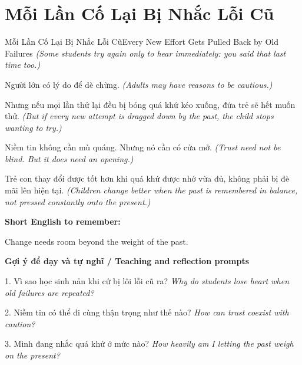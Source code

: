 \section{Mỗi Lần Cố Lại Bị Nhắc Lỗi Cũ}
\begin{truyen}{Mỗi Lần Cố Lại Bị Nhắc Lỗi Cũ}{Every New Effort Gets Pulled Back by Old Failures}
\textit{(Some students try again only to hear immediately: you said that last time too.)}

Người lớn có lý do để dè chừng.
\textit{(Adults may have reasons to be cautious.)}

Nhưng nếu mọi lần thử lại đều bị bóng quá khứ kéo xuống, đứa trẻ sẽ hết muốn thử.
\textit{(But if every new attempt is dragged down by the past, the child stops wanting to try.)}

Niềm tin không cần mù quáng. Nhưng nó cần có cửa mở.
\textit{(Trust need not be blind. But it does need an opening.)}

\end{truyen}

\begin{baihoc}
Trẻ con thay đổi được tốt hơn khi quá khứ được nhớ vừa đủ, không phải bị đè mãi lên hiện tại.
\textit{(Children change better when the past is remembered in balance, not pressed constantly onto the present.)}
\end{baihoc}

\begin{ghinhoanh}
\textbf{Short English to remember:}

Change needs room beyond the weight of the past.

\end{ghinhoanh}

\begin{tuhocnhanh}
\textbf{Gợi ý để dạy và tự nghĩ / Teaching and reflection prompts}

1. Vì sao học sinh nản khi cứ bị lôi lỗi cũ ra? \textit{Why do students lose heart when old failures are repeated?}

2. Niềm tin có thể đi cùng thận trọng như thế nào? \textit{How can trust coexist with caution?}

3. Mình đang nhắc quá khứ ở mức nào? \textit{How heavily am I letting the past weigh on the present?}
\end{tuhocnhanh}
\ngancach

